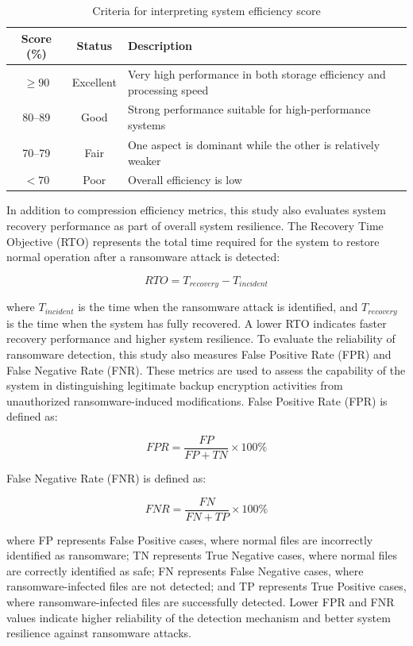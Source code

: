 \documentclass{iaesarticle}
\begin{document}
\begin{table}[H]
\centering
\fontsize{8pt}{10pt}\selectfont
\caption{Criteria for interpreting system efficiency score}
\label{tab:efficiency_criteria}
\begin{tabularx}{\textwidth}{@{}c c X@{}}
\hline
\textbf{Score (\%)} & \textbf{Status} & \textbf{Description} \\
\hline
$\geq 90$ & Excellent & Very high performance in both storage efficiency and processing speed \\
80--89 & Good & Strong performance suitable for high-performance systems \\
70--79 & Fair & One aspect is dominant while the other is relatively weaker \\
$< 70$ & Poor & Overall efficiency is low \\
\hline
\end{tabularx}
\end{table}

In addition to compression efficiency metrics, this study also evaluates system recovery performance as part of overall system resilience. The Recovery Time Objective (RTO) represents the total time required for the system to restore normal operation after a ransomware attack is detected:

\begin{equation}
RTO = T_{recovery} - T_{incident}
\end{equation}

where $T_{incident}$ is the time when the ransomware attack is identified, and $T_{recovery}$ is the time when the system has fully recovered. A lower RTO indicates faster recovery performance and higher system resilience. To evaluate the reliability of ransomware detection, this study also measures False Positive Rate (FPR) and False Negative Rate (FNR). These metrics are used to assess the capability of the system in distinguishing legitimate backup encryption activities from unauthorized ransomware-induced modifications. False Positive Rate (FPR) is defined as:

\begin{equation}
FPR = \frac{FP}{FP + TN} \times 100\%
\end{equation}

False Negative Rate (FNR) is defined as:

\begin{equation}
FNR = \frac{FN}{FN + TP} \times 100\%
\end{equation}

where FP represents False Positive cases, where normal files are incorrectly identified as ransomware; TN represents True Negative cases, where normal files are correctly identified as safe; FN represents False Negative cases, where ransomware-infected files are not detected; and TP represents True Positive cases, where ransomware-infected files are successfully detected. Lower FPR and FNR values indicate higher reliability of the detection mechanism and better system resilience against ransomware attacks.
\end{document}
